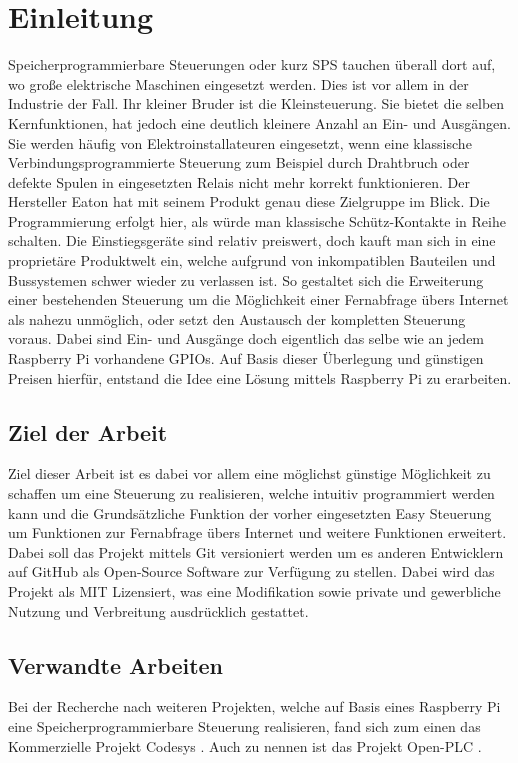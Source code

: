  \section{Einleitung}
 Speicherprogrammierbare Steuerungen oder kurz SPS tauchen überall dort auf, wo große elektrische Maschinen eingesetzt werden. Dies ist vor allem in der Industrie der Fall. Ihr kleiner Bruder ist die Kleinsteuerung. Sie bietet die selben Kernfunktionen, hat jedoch eine deutlich kleinere Anzahl an Ein- und Ausgängen. Sie werden häufig von Elektroinstallateuren eingesetzt, wenn eine klassische Verbindungsprogrammierte Steuerung zum Beispiel durch Drahtbruch oder defekte Spulen in eingesetzten Relais nicht mehr korrekt funktionieren. Der Hersteller Eaton hat mit seinem Produkt  genau diese Zielgruppe im Blick. Die Programmierung erfolgt hier, als würde man klassische Schütz-Kontakte in Reihe schalten. Die Einstiegsgeräte sind relativ preiswert, doch kauft man sich in eine proprietäre Produktwelt ein, welche aufgrund von inkompatiblen Bauteilen und Bussystemen schwer wieder zu verlassen ist. So gestaltet sich die Erweiterung einer bestehenden Steuerung um die Möglichkeit einer Fernabfrage übers Internet als nahezu unmöglich, oder setzt den Austausch der kompletten Steuerung voraus. Dabei sind Ein- und Ausgänge doch eigentlich das selbe wie an jedem Raspberry Pi vorhandene GPIOs. Auf Basis dieser Überlegung und günstigen Preisen hierfür, entstand die Idee eine Lösung mittels Raspberry Pi zu erarbeiten. 
\subsection{Ziel der Arbeit}
Ziel dieser Arbeit ist es dabei vor allem eine möglichst günstige Möglichkeit zu schaffen um eine Steuerung zu realisieren, welche intuitiv programmiert werden kann und die Grundsätzliche Funktion der vorher eingesetzten Easy Steuerung um Funktionen zur Fernabfrage übers Internet und weitere Funktionen erweitert. Dabei soll das Projekt mittels Git versioniert werden um es anderen Entwicklern auf GitHub als Open-Source Software zur Verfügung zu stellen. Dabei wird das Projekt als MIT Lizensiert, was eine Modifikation sowie private und gewerbliche Nutzung und Verbreitung ausdrücklich gestattet. 
\subsection{Verwandte Arbeiten}
Bei der Recherche nach weiteren Projekten, welche auf Basis eines Raspberry Pi eine Speicherprogrammierbare Steuerung realisieren, fand sich zum einen das Kommerzielle Projekt Codesys \cite{URL:Codesys}. Auch zu nennen ist das Projekt Open-PLC \cite{URL:OpenPLC}. 
